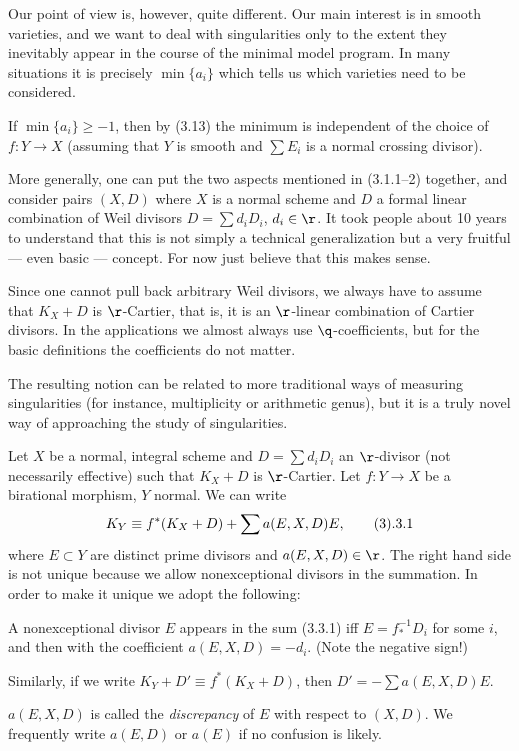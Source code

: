 Our point of view is, however, quite different. Our main interest is in smooth
varieties, and we want to deal with singularities only to the extent they
inevitably appear in the course of the minimal model program. In many situations
it  is precisely
$\min\{a_i\}$ which tells us which varieties need to be considered.


If $\min\{a_i\}\geq -1$, then by (3.13) the minimum is independent of
the choice of $f:Y\to X$ (assuming that $Y$ is
smooth and $\sum E_i$ is a normal crossing divisor). 
\enddemo



More generally, one can put the two aspects mentioned in (3.1.1--2)  together,
and consider pairs $(X,D)$ where $X$ is a normal scheme and $D$ a formal linear
combination of Weil divisors $D=\sum d_iD_i$, $d_i\in \r$. It took people about
10 years to understand that this is not simply a technical  generalization but
a very fruitful ---  even  basic --- concept. For now just believe
that this  makes sense.

Since one cannot pull back arbitrary Weil divisors, we always have to assume
that $K_X+D$ is $\r$-Cartier, that is, it is an $\r$-linear combination of
Cartier divisors. In the applications we almost always use $\q$-coefficients,
but for the basic definitions the coefficients  do not matter.

The resulting notion  can be related to more traditional ways of measuring
singularities (for instance, multiplicity or arithmetic genus), but it
is a truly novel way of approaching the study of singularities.


  Let $X$ be a normal, integral scheme and $D=\sum
d_iD_i$ an
$\r$-divisor (not necessarily effective) such that $K_X+D$ is $\r$-Cartier. Let
$f:Y\to X$ be a   birational morphism, $Y$ normal. We can write 
$$
K_Y\equiv f^*(K_X+D)+\sum a(E,X,D)E,
\tag 3.3.1
$$
where $E\subset Y$ are  
distinct prime divisors and $a(E,X,D)\in \r$. The right hand side is not
unique because we allow nonexceptional divisors in the summation. In order to
make it unique we adopt the following:

  A nonexceptional divisor
$E$ appears in the sum  (3.3.1) iff $E=f^{-1}_*D_i$ for some $i$, and then with
the coefficient
$a(E,X,D)=-d_i$. (Note the negative sign!)

Similarly, if we write $K_Y+D'\equiv f^*(K_X+D)$, then $D'=-\sum a(E,X,D)E$.
\enddemo

$a(E,X,D)$ is called the {\it discrepancy} of $E$ with respect to $(X,D)$.  
We   frequently write $a(E,D)$ or $a(E)$ if no confusion is likely.

